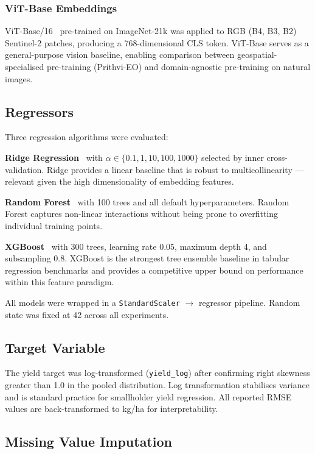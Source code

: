 \documentclass[journal]{IEEEtran}
\begin{document}
\subsubsection{ViT-Base Embeddings}
ViT-Base/16~\cite{dosovitskiy2021vit} pre-trained on ImageNet-21k was applied to
RGB (B4, B3, B2) Sentinel-2 patches, producing a 768-dimensional CLS token.
ViT-Base serves as a general-purpose vision baseline, enabling comparison between
geospatial-specialised pre-training (Prithvi-EO) and domain-agnostic pre-training
on natural images.

\subsection{Regressors}

Three regression algorithms were evaluated:

\textbf{Ridge Regression}~\cite{hoerl1970ridge} with $\alpha \in \{0.1, 1, 10, 100, 1000\}$
selected by inner cross-validation. Ridge provides a linear baseline that is
robust to multicollinearity — relevant given the high dimensionality of
embedding features.

\textbf{Random Forest}~\cite{breiman2001rf} with 100 trees and all default
hyperparameters. Random Forest captures non-linear interactions without
being prone to overfitting individual training points.

\textbf{XGBoost}~\cite{chen2016xgboost} with 300 trees, learning rate 0.05,
maximum depth 4, and subsampling 0.8.
XGBoost is the strongest tree ensemble baseline in tabular regression benchmarks
and provides a competitive upper bound on performance within this feature paradigm.

All models were wrapped in a \texttt{StandardScaler} $\rightarrow$ regressor
pipeline. Random state was fixed at 42 across all experiments.

\subsection{Target Variable}

The yield target was log-transformed (\texttt{yield\_log}) after confirming
right skewness greater than 1.0 in the pooled distribution.
Log transformation stabilises variance and is standard practice for
smallholder yield regression. All reported RMSE values are back-transformed
to kg/ha for interpretability.

\subsection{Missing Value Imputation}
\end{document}
